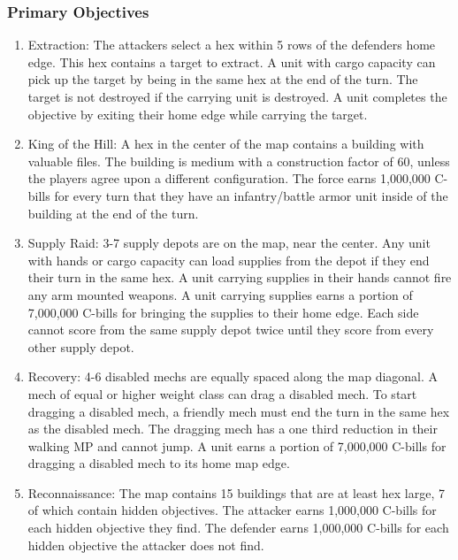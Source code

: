 \documentclass[UTF8]{article}
\begin{document}
\subsubsection{Primary Objectives}

\begin{enumerate}

\item Extraction: The attackers select a hex within 5 rows of the defenders home edge.
This hex contains a target to extract.
A unit with cargo capacity can pick up the target by being in the same hex at the end of the turn.
The target is not destroyed if the carrying unit is destroyed.
A unit completes the objective by exiting their home edge while carrying the target.

\item King of the Hill: A hex in the center of the map contains a building with valuable files.
The building is medium with a construction factor of 60, unless the players agree upon a different configuration.
The force earns 1,000,000 C-bills for every turn that they have an infantry/battle armor unit inside of the building at the end of the turn.

\item Supply Raid: 3-7 supply depots are on the map, near the center.
Any unit with hands or cargo capacity can load supplies from the depot if they end their turn in the same hex.
A unit carrying supplies in their hands cannot fire any arm mounted weapons.
A unit carrying supplies earns a portion of 7,000,000 C-bills for bringing the supplies to their home edge.
Each side cannot score from the same supply depot twice until they score from every other supply depot.

\item Recovery: 4-6 disabled mechs are equally spaced along the map diagonal.
A mech of equal or higher weight class can drag a disabled mech.
To start dragging a disabled mech, a friendly mech must end the turn in the same hex as the disabled mech.
The dragging mech has a one third reduction in their walking MP and cannot jump.
A unit earns a portion of 7,000,000 C-bills for dragging a disabled mech to its home map edge.

\item Reconnaissance: The map contains 15 buildings that are at least hex large, 7 of which contain hidden objectives.
The attacker earns 1,000,000 C-bills for each hidden objective they find. 
The defender earns 1,000,000 C-bills for each hidden objective the attacker does not find.


\end{enumerate}
\end{document}
